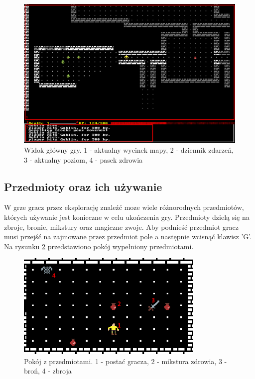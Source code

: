 \documentclass[12pt,twoside]{article}
\begin{document}
\FloatBarrier
\begin{figure}[h]
	\centering
	\includegraphics[width=16cm]{images/mygame/game_window.png}
	\caption{Widok główny gry. 1 - aktualny wycinek mapy, 2 - dziennik zdarzeń, 3 - aktualny poziom, 4 - pasek zdrowia }
	\label{mygame:game_window}
\end{figure}
\FloatBarrier


\subsection{Przedmioty oraz ich używanie}
W grze gracz przez eksplorację znaleźć moze wiele różnorodnych przedmiotów, których używanie jest konieczne w celu ukończenia gry. Przedmioty dzielą się na zbroje, bronie, mikstury oraz magiczne zwoje. Aby podnieść przedmiot gracz musi przejść na zajmowane przez przedmiot pole a następnie wcisnąć klawisz 'G'. Na rysunku \ref{mygame:item_room} przedstawiono pokój wypełniony przedmiotami.

\FloatBarrier
\begin{figure}[h]
	\centering
	\includegraphics[width=9cm]{images/mygame/item_room.png}
	\caption{Pokój z przedmiotami. 1 - postać gracza, 2 - mikstura zdrowia, 3 - broń, 4 - zbroja }
	\label{mygame:item_room}
\end{figure}
\FloatBarrier
\end{document}
